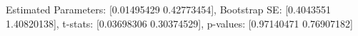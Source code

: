 Estimated Parameters: [0.01495429 0.42773454], Bootstrap SE: [0.4043551  1.40820138], t-stats: [0.03698306 0.30374529], p-values: [0.97140471 0.76907182]